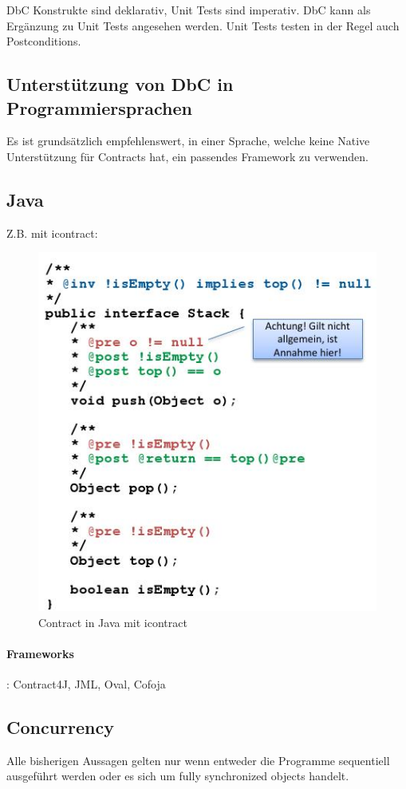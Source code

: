 DbC Konstrukte sind deklarativ, Unit Tests sind imperativ. DbC kann als Ergänzung zu Unit Tests angesehen werden. Unit Tests testen in der Regel auch Postconditions.

\subsection{Unterstützung von DbC in Programmiersprachen}

Es ist grundsätzlich empfehlenswert, in einer Sprache, welche keine Native Unterstützung für Contracts hat, ein passendes Framework zu verwenden.

\subsection{Java}

Z.B. mit icontract:

\begin{figure}[h]
	\centering
	\includegraphics[width=0.7\linewidth]{img/contracts_java_icontract}
	\caption{Contract in Java mit icontract}
	\label{fig:contractsjavaicontract}
\end{figure}

\paragraph{Frameworks}: Contract4J, JML, Oval, Cofoja


\subsection{Concurrency}
Alle bisherigen Aussagen gelten nur wenn entweder die Programme sequentiell ausgeführt werden oder es sich um fully synchronized objects handelt.

